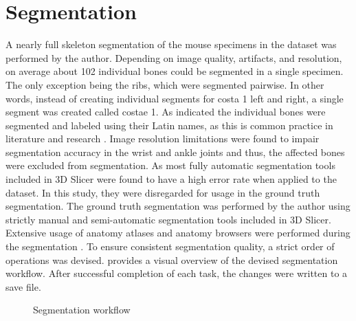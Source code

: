 \section{Segmentation}\label{s:segmentation}
A nearly full skeleton segmentation of the mouse specimens in the dataset was performed by the author.
Depending on image quality, artifacts, and resolution, on average about 102 individual bones could be segmented in a single specimen.
The only exception being the ribs, which were segmented pairwise.
In other words, instead of creating individual segments for costa 1 left and right, a single segment was created called costae 1.
As indicated the individual bones were segmented and labeled using their Latin names, as this is common practice in literature and research \cite{harrisonVertebralLandmarksIdentification2013,jeromeSkeletalSystem2018,ruberteMorphologicalMousePhenotyping2017,ruberteBridgingMouseHuman2023}.
Image resolution limitations were found to impair segmentation accuracy in the wrist and ankle joints and thus, the affected bones were excluded from segmentation.
As most fully automatic segmentation tools included in 3D Slicer were found to have a high error rate when applied to the dataset.
In this study, they were disregarded for usage in the ground truth segmentation.
The ground truth segmentation was performed by the author using strictly manual and semi-automatic segmentation tools included in 3D Slicer.
Extensive usage of anatomy atlases and anatomy browsers were performed during the segmentation \cite{jeromeSkeletalSystem2018,harrisonVertebralLandmarksIdentification2013,platzerTaschenatlasAnatomieBd2013,ruberteMorphologicalMousePhenotyping2017,ruberteBridgingMouseHuman2023,rautenkranzSectionalanatomy2018}.
To ensure consistent segmentation quality, a strict order of operations was devised.
 provides a visual overview of the devised segmentation workflow.
After successful completion of each task, the changes were written to a save file.
\begin{figure}[ht]
	\begin{center}
		
	\end{center}
	\caption{Segmentation workflow}\label{fig:segmentation-workflow}
\end{figure}

